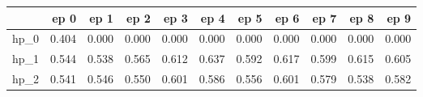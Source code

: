 \begin{tabular}{lrrrrrrrrrr}
\toprule
{} &   ep 0 &   ep 1 &   ep 2 &   ep 3 &   ep 4 &   ep 5 &   ep 6 &   ep 7 &   ep 8 &   ep 9 \\
\midrule
hp\_0 &  0.404 &  0.000 &  0.000 &  0.000 &  0.000 &  0.000 &  0.000 &  0.000 &  0.000 &  0.000 \\
hp\_1 &  0.544 &  0.538 &  0.565 &  0.612 &  0.637 &  0.592 &  0.617 &  0.599 &  0.615 &  0.605 \\
hp\_2 &  0.541 &  0.546 &  0.550 &  0.601 &  0.586 &  0.556 &  0.601 &  0.579 &  0.538 &  0.582 \\
\bottomrule
\end{tabular}
